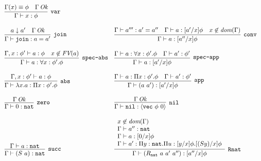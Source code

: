 \documentclass[copyright]{eptcs}
\newcommand{\vc}[0]{\texttt{vec}}
\newcommand{\nat}[0]{\texttt{nat}}
\newcommand{\nil}[0]{\texttt{nil}}
\newcommand{\join}[0]{\texttt{join}}
\begin{document}
\begin{figure}
\[
\begin{array}{ll}
\infer[\texttt{var}]{\Gamma\vdash x:\phi}{\Gamma(x) \equiv \phi & \Gamma\,\textit{Ok}}
&
\ 
\\ \\

\infer[\texttt{join}]{\Gamma\vdash \join : a = a'}{a \downarrow a' & \Gamma\,\textit{Ok}}
&
\infer[\texttt{conv}]{\Gamma\vdash a:[a''/x]\phi}{\Gamma \vdash a''': a' = a'' & \Gamma \vdash a:[a'/x]\phi & x\not\in\textit{dom}(\Gamma)} 
\\ \\

\infer[\texttt{spec-abs}]{\Gamma \vdash a : \forall x:\phi'.\phi}{\Gamma, x:\phi' \vdash a:\phi & x\not\in\textit{FV}(a)}
&
\infer[\texttt{spec-app}]{\Gamma \vdash a : [a'/x]\phi}{\Gamma \vdash a:\forall x:\phi'.\phi & \Gamma \vdash a':\phi'}
\\ \\

\infer[\texttt{abs}]{\Gamma \vdash \lambda x.a : \Pi x:\phi'.\phi}
                    {\Gamma, x:\phi' \vdash a:\phi}
&
\infer[\texttt{app}]{\Gamma \vdash (a\ a') : [a'/x]\phi}{\Gamma \vdash a:\Pi x:\phi'.\phi & \Gamma\vdash a':\phi'}

\\ \\
\infer[\texttt{zero}]{\Gamma\vdash 0:\nat}{\Gamma\,\textit{Ok}} 
&
\infer[\texttt{nil}]{\Gamma\vdash \nil:\langle\vc\ \phi\ 0\rangle}{\Gamma\,\textit{Ok}} 

\\ \\

\infer[\texttt{succ}]{\Gamma\vdash (S\ a):\nat}{\Gamma\vdash a:\nat  }
&
\infer[\texttt{Rnat}]{\Gamma\vdash (R_\nat\ a\ a'\ a''):[a''/x]\phi}
      {\begin{array}{l} 
       x\not\in\textit{dom}(\Gamma) \\
       \Gamma \vdash a'' : \nat \\
       \Gamma \vdash a : [0/x]\phi \\
       \Gamma \vdash a' : \Pi y:\nat. \Pi u : [y/x]\phi. [(S y)/x]\phi
       \end{array}}
\\ \\ 



\end{array}\]
\end{figure}
\end{document}
